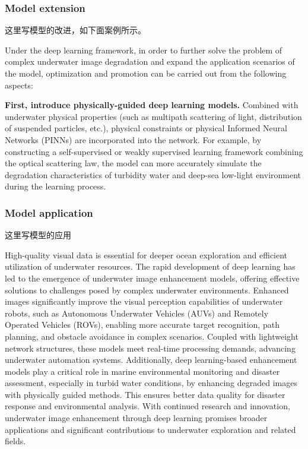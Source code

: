 \documentclass{apmcmthesis}                                             %
\begin{document}
\subsubsection{Model extension}

这里写模型的改进，如下面案例所示。

Under the deep learning framework, in order to further solve the problem of complex underwater image degradation and expand the application scenarios of the model, optimization and promotion can be carried out from the following aspects:

\textbf{First, introduce physically-guided deep learning models. }
Combined with underwater physical properties (such as multipath scattering of light, distribution of suspended particles, etc.), physical constraints or physical Informed Neural Networks (PINNs) are incorporated into the network. For example, by constructing a self-supervised or weakly supervised learning framework combining the optical scattering law, the model can more accurately simulate the degradation characteristics of turbidity water and deep-sea low-light environment during the learning process.

\subsubsection{Model application}

这里写模型的应用

High-quality visual data is essential for deeper ocean exploration and efficient utilization of underwater resources. The rapid development of deep learning has led to the emergence of underwater image enhancement models, offering effective solutions to challenges posed by complex underwater environments. Enhanced images significantly improve the visual perception capabilities of underwater robots, such as Autonomous Underwater Vehicles (AUVs) and Remotely Operated Vehicles (ROVs), enabling more accurate target recognition, path planning, and obstacle avoidance in complex scenarios. Coupled with lightweight network structures, these models meet real-time processing demands, advancing underwater automation systems. Additionally, deep learning-based enhancement models play a critical role in marine environmental monitoring and disaster assessment, especially in turbid water conditions, by enhancing degraded images with physically guided methods. This ensures better data quality for disaster response and environmental analysis. With continued research and innovation, underwater image enhancement through deep learning promises broader applications and significant contributions to underwater exploration and related fields.
\end{document}
